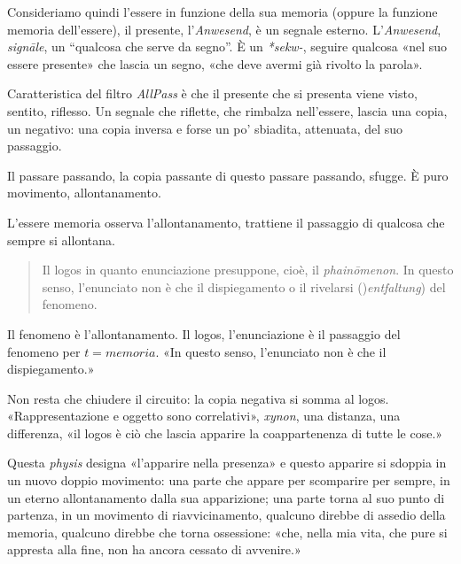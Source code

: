 \begin{figure}[ht]
  \centering
  \label{tikz:ciclobase}
\end{figure}

Consideriamo quindi l'essere in funzione della sua memoria (oppure la funzione
memoria dell'essere), il presente, l'\emph{Anwesend}, è un segnale esterno.
L'\emph{Anwesend}, \emph{signāle}, un “qualcosa che serve da segno”. È un
\emph{*sekw-}, seguire qualcosa «nel suo essere presente» che lascia un segno,
«che deve avermi già rivolto la parola».

Caratteristica del filtro \emph{AllPass} è che il presente che si presenta viene
visto, sentito, riflesso. Un segnale che riflette, che rimbalza nell'essere,
lascia una copia, un negativo: una copia inversa e forse un po' sbiadita,
attenuata, del suo passaggio.

Il passare passando, la copia passante di questo passare passando, sfugge. È
puro movimento, allontanamento.

L'essere memoria osserva l'allontanamento, trattiene il passaggio di qualcosa
che sempre si allontana.

\begin{quote}
  \begin{sf}
    \small
    Il logos in quanto enunciazione presuppone, cioè, il \emph{phainōmenon}. In
    questo senso, l'enunciato non è che il dispiegamento o il rivelarsi
    ()\emph{entfaltung}) del fenomeno.
  \end{sf}
\end{quote}

Il fenomeno è l'allontanamento. Il logos, l'enunciazione è il passaggio del
fenomeno per $t=memoria$. «In questo senso, l'enunciato non è che il
dispiegamento.»

Non resta che chiudere il circuito: la copia negativa si somma al logos.
«Rappresentazione e oggetto sono correlativi», \emph{xynon}, una distanza,
una differenza, «il logos è ciò che lascia apparire la coappartenenza di tutte
le cose.»

Questa \emph{physis} designa «l'apparire nella presenza» e questo apparire si
sdoppia in un nuovo doppio movimento: una parte che appare per scomparire per
sempre, in un eterno allontanamento dalla sua apparizione; una parte torna al
suo punto di partenza, in un movimento di riavvicinamento, qualcuno direbbe di
assedio della memoria, qualcuno direbbe che torna ossessione: «che, nella mia
vita, che pure si appresta alla fine, non ha ancora cessato di avvenire.»

